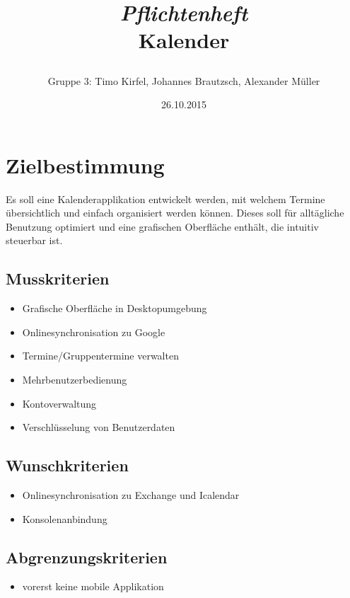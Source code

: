 \documentclass[a4paper]{article}
\title{\begin{center}
		\emph{{\Huge Pflichtenheft}} \\ {\large Kalender}
       \end{center} }
\author{Gruppe 3: Timo Kirfel, Johannes Brautzsch, Alexander Müller}
\date{26.10.2015}
\begin{document}
  \maketitle
  \newpage

  \tableofcontents %
  \newpage

  \section{Zielbestimmung}
		Es soll eine Kalenderapplikation entwickelt werden, mit welchem Termine übersichtlich und einfach organisiert werden können. Dieses soll für alltägliche Benutzung optimiert und eine grafischen Oberfläche enthält, die intuitiv steuerbar ist.

    \subsection{Musskriterien}
        \begin{itemize}
			\item Grafische Oberfläche in Desktopumgebung
			\item Onlinesynchronisation zu Google
			\item Termine/Gruppentermine verwalten
			\item Mehrbenutzerbedienung
			\item Kontoverwaltung
			\item Verschlüsselung von Benutzerdaten
		\end{itemize}

    \subsection{Wunschkriterien}
        \begin{itemize}
			\item Onlinesynchronisation zu Exchange und Icalendar
			\item Konsolenanbindung
		\end{itemize}

    \subsection{Abgrenzungskriterien}
        \begin{itemize}
	        \item vorerst keine mobile Applikation
	    \end{itemize}
\end{document}
